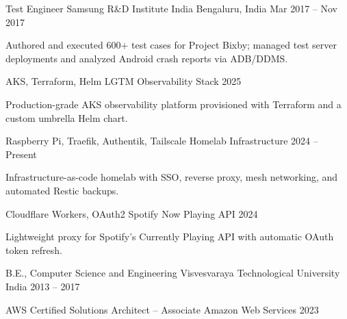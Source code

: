 \documentclass[11pt, a4paper]{awesome-cv}
\begin{document}
\begin{cventries}
  \cventry
    {Test Engineer}
    {Samsung R\&D Institute India}
    {Bengaluru, India}
    {Mar 2017 -- Nov 2017}
    {
      \begin{cvitems}
        \item {Authored and executed 600+ test cases for Project Bixby; managed test server deployments and analyzed Android crash reports via ADB/DDMS.}
      \end{cvitems}
    }

\end{cventries}

\begin{cventries}

  \cventry
    {AKS, Terraform, Helm}
    {LGTM Observability Stack}
    {}
    {2025}
    {
      \begin{cvitems}
        \item {Production-grade AKS observability platform provisioned with Terraform and a custom umbrella Helm chart.}
      \end{cvitems}
    }

  \cventry
    {Raspberry Pi, Traefik, Authentik, Tailscale}
    {Homelab Infrastructure}
    {}
    {2024 -- Present}
    {
      \begin{cvitems}
        \item {Infrastructure-as-code homelab with SSO, reverse proxy, mesh networking, and automated Restic backups.}
      \end{cvitems}
    }

  \cventry
    {Cloudflare Workers, OAuth2}
    {Spotify Now Playing API}
    {}
    {2024}
    {
      \begin{cvitems}
        \item {Lightweight proxy for Spotify's Currently Playing API with automatic OAuth token refresh.}
      \end{cvitems}
    }

\end{cventries}

\begin{cventries}

  \cventry
    {B.E., Computer Science and Engineering}
    {Visvesvaraya Technological University}
    {India}
    {2013 -- 2017}
    {}

  \cventry
    {AWS Certified Solutions Architect -- Associate}
    {Amazon Web Services}
    {}
    {2023}
    {}

\end{cventries}

\end{document}
